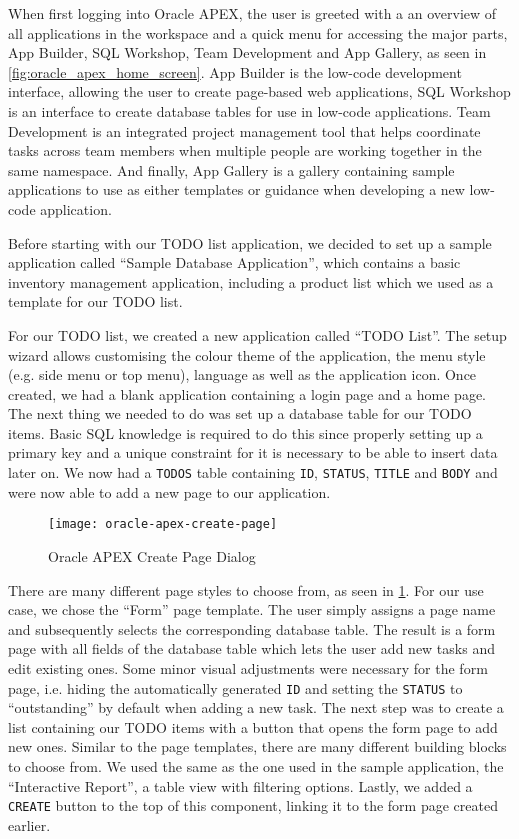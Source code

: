 \documentclass[runningheads]{llncs}
\begin{document}
When first logging into Oracle APEX, the user is greeted with a an overview of all applications in the workspace and a quick menu for accessing the major parts, App Builder, SQL Workshop, Team Development and App Gallery, as seen in \cref{fig:oracle_apex_home_screen}. App Builder is the low-code development interface, allowing the user to create page-based web applications, SQL Workshop is an interface to create database tables for use in low-code applications. Team Development is an integrated project management tool that helps coordinate tasks across team members when multiple people are working together in the same namespace. And finally, App Gallery is a gallery containing sample applications to use as either templates or guidance when developing a new low-code application.

Before starting with our TODO list application, we decided to set up a sample application called “Sample Database Application”, which contains a basic inventory management application, including a product list which we used as a template for our TODO list.

For our TODO list, we created a new application called “TODO List”. The setup wizard allows customising the colour theme of the application, the menu style (e.g. side menu or top menu), language as well as the application icon. Once created, we had a blank application containing a login page and a home page. The next thing we needed to do was set up a database table for our TODO items. Basic SQL knowledge is required to do this since properly setting up a primary key and a unique constraint for it is necessary to be able to insert data later on. We now had a \texttt{TODOS} table containing \texttt{ID}, \texttt{STATUS}, \texttt{TITLE} and \texttt{BODY} and were now able to add a new page to our application.

\begin{figure}
  \centering
  \texttt{[image: oracle-apex-create-page]}
  \caption{Oracle APEX Create Page Dialog}
  \label{fig:oracle_apex_create_page}
\end{figure}

There are many different page styles to choose from, as seen in \cref{fig:oracle_apex_create_page}. For our use case, we chose the “Form” page template. The user simply assigns a page name and subsequently selects the  corresponding database table. The result is a form page with all fields of the database table which lets the user add new tasks and edit existing ones. Some minor visual adjustments were necessary for the form page, i.e. hiding the automatically generated \texttt{ID} and setting the \texttt{STATUS} to “outstanding” by default when adding a new task. The next step was to create a list containing our TODO items with a button that opens the form page to add new ones. Similar to the page templates, there are many different building blocks to choose from. We used the same as the one used in the sample application, the “Interactive Report”, a table view with filtering options. Lastly, we added a \texttt{CREATE} button to the top of this component, linking it to the form page created earlier.
\end{document}
